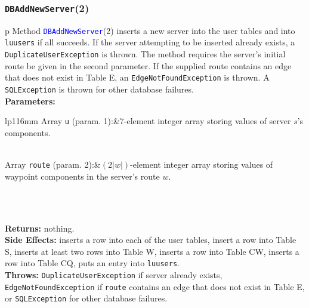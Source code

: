 \documentclass{article}
\theoremstyle{definition}                   %
\begin{document}
\subsubsection{{\tt{}\protect{}DBAddNewServer}(2)}
\begin{tabular}{p{\textwidth}}
\toprule
{}
Method \textcolor{blue}{{\tt{}\protect{}DBAddNewServer}}(2) inserts a new server into the
user tables and into {\tt{}\protect{}lu{}users} if all succeeds.  If the server attempting to
be inserted already exists, a {\tt{}DuplicateUserException} is thrown. The method
requires the server's initial route be given in the second parameter. If the
supplied route contains an edge that does not exist in Table E, an
{\tt{}EdgeNotFoundException} is thrown. A {\tt{}SQLException} is thrown for other
database failures.\\
\midrule
\textbf{Parameters:} \\
\begin{tabular}{lp{116mm}}
Array {\tt{}u} (param. 1):&7-element integer array storing values of
server $s$'s components.

\\
Array {\tt{}route} (param. 2):&$(2|w|)$-element integer array storing values of
waypoint components in the server's route $w$.

\\
\end{tabular}\\
\textbf{Returns:} nothing.\\
\textbf{Side Effects:} inserts a row into each of the user tables, insert a
row into Table S, inserts at least two rows into Table W, inserts a row into Table CW,
inserts a row into Table CQ, puts an entry into {\tt{}\protect{}lu{}users}.\\
\textbf{Throws:} {\tt{}DuplicateUserException} if server already exists,
{\tt{}EdgeNotFoundException} if {\tt{}route} contains an edge that does not exist
in Table E, or {\tt{}SQLException} for other database failures.\\
\bottomrule
\end{tabular}
\end{document}
